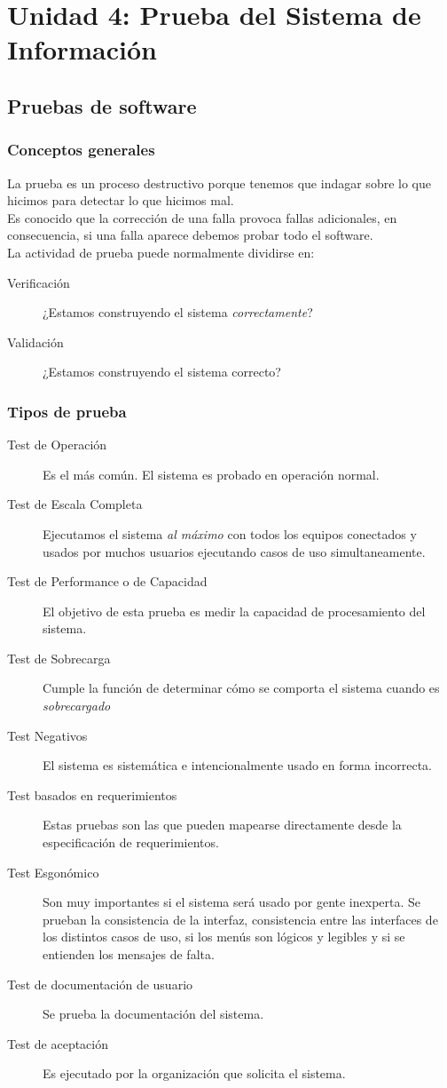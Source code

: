 \section{Unidad 4: Prueba del Sistema de Información}
\subsection{Pruebas de software}
\subsubsection{Conceptos generales}
La prueba es un proceso destructivo porque tenemos que indagar sobre lo que hicimos para detectar lo que hicimos mal.\\
Es conocido que la corrección de una falla provoca fallas adicionales, en consecuencia, si una falla aparece debemos probar todo el software.\\
La actividad de prueba puede normalmente dividirse en:
\begin{description}
	\item[Verificación] ¿Estamos construyendo el sistema \emph{correctamente}?
	\item[Validación] ¿Estamos construyendo el sistema correcto?
\end{description}
\subsubsection{Tipos de prueba}
\begin{description}
	\item[Test de Operación] Es el más común. El sistema es probado en operación normal.
	\item[Test de Escala Completa] Ejecutamos el sistema \emph{al máximo} con todos los equipos conectados y usados por muchos usuarios ejecutando casos de uso simultaneamente.
	\item[Test de Performance o de Capacidad] El objetivo de esta prueba es medir la capacidad de procesamiento del sistema.
	\item[Test de Sobrecarga] Cumple la función de determinar cómo se comporta el sistema cuando es \emph{sobrecargado}
	\item[Test Negativos] El sistema es sistemática e intencionalmente usado en forma incorrecta.
	\item[Test basados en requerimientos] Estas pruebas son las que pueden mapearse directamente desde la especificación de requerimientos.
	\item[Test Esgonómico] Son muy importantes si el sistema será usado por gente inexperta. Se prueban la consistencia de la interfaz, consistencia entre las interfaces de los distintos casos de uso, si los menús son lógicos y legibles y si se entienden los mensajes de falta.
	\item[Test de documentación de usuario] Se prueba la documentación del sistema.
	\item[Test de aceptación] Es ejecutado por la organización que solicita el sistema.
\end{description}
